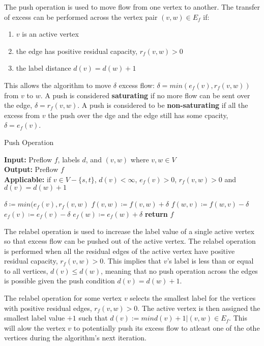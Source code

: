 \begin{definition}
	The push operation is used to move flow from one vertex to another. The transfer of excess can be performed across the vertex pair $(v,w) \in E_f$ if:
	\begin{enumerate}
		\item $v$ is an active vertex
		\item the edge has positive residual capacity, $r_f(v,w)>0$
		\item the label distance $d(v) = d(w)+1$
	\end{enumerate}
\end{definition}
This allows the algorithm to move $\delta$ excess flow: $\delta = min (e_f(v), r_f(v,w))$ from $v$ to $w$. A push is considered \textbf{saturating} if no more flow can be sent over the edge, $\delta = r_f(v,w)$. A push is considered to be \textbf{non-saturating} if all the excess from $v$ the push over the dge and the edge still has some cpacity, $\delta = e_f(v)$.

\begin{algorithm}
	\caption{Push Operation}\label{alg:push}
	\textbf{Input:} Preflow $f$, labels $d$, and $(v,w)$ where $v,w \in V$\\
	\textbf{Output:} Preflow $f$\\
	\textbf{Applicable:} if $v \in V-\{s,t\}$, $d(v) < \infty$, $e_f(v)>0$, $r_f(v,w)>0$ and $d(v)=d(w)+1$
	\begin{algorithmic}[1]
		\State $\delta \coloneqq min(e_f(v), r_f(v,w)$
		\State $f(v,w) \coloneqq f(v,w) + \delta$
		\State $f(w,v) \coloneqq f(w,v) - \delta$
		\State $e_f(v) \coloneqq e_f(v) - \delta$
		\State $e_f(w) \coloneqq e_f(w) + \delta$
		\State \textbf{return} $f$
		\EndProcedure
	\end{algorithmic}
\end{algorithm}
	
\begin{definition}
	The relabel operation is used to increase the label value of a single active vertex so that excess flow can be pushed out of the active vertex. The relabel operation is performed when all the residual edges of the active vertex have positive residual capacity, $r_f(v,w)>0$. This implies that $v$'s label is less than or equal to all vertices, $d(v) \leq d(w)$, meaning that no push operation across the edges is possible given the push condition $d(v) = d(w)+1$.
\end{definition}
The relabel operation for some vertex $v$ selects the smallest label for the vertices with positive residual edges, $r_f(v,w)>0$. The active vertex is then assigned the smallest label value $+1$ such that $d(v) := min{d(v)+1 | (v,w) \in E_f}$. This will alow the vertex $v$ to potentially push its excess flow to atleast one of the othe vertices during the algorithm's next iteration.

